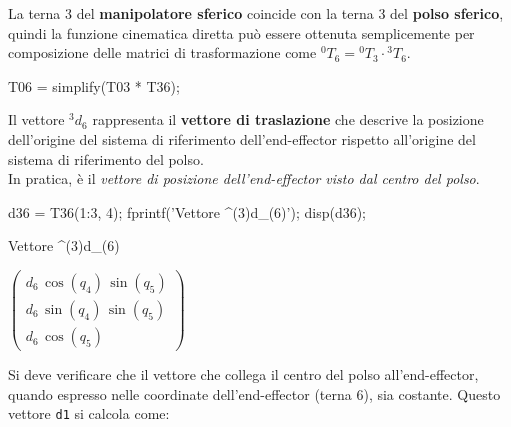 \documentclass[11pt, a4paper]{article}
\begin{document}
\begin{par}
\begin{flushleft}
La terna 3 del \textbf{manipolatore sferico} coincide con la terna 3 del \textbf{polso sferico}, quindi la funzione cinematica diretta può essere ottenuta semplicemente per composizione delle matrici di trasformazione come ${}^0 T_6 = {}^0 T_3 \cdot {}^3 T_6$.
\end{flushleft}
\end{par}

\begin{matlabcode}
T06 = simplify(T03 * T36);
\end{matlabcode}
\begin{par}
\begin{flushleft}
Il vettore $^3 d_6$ rappresenta il \textbf{vettore di traslazione} che descrive la posizione dell'origine del sistema di riferimento dell'end-effector rispetto all'origine del sistema di riferimento del polso.\\
In pratica, è il \textit{vettore di posizione dell'end-effector visto dal centro del polso}.
\end{flushleft}
\end{par}

\begin{matlabcode}
d36 = T36(1:3, 4);
fprintf('Vettore ^(3)d_(6)');
disp(d36);
\end{matlabcode}
\begin{matlaboutput}
Vettore ^(3)d_(6)
\end{matlaboutput}
\begin{matlabsymbolicoutput}
$\displaystyle \left(\begin{array}{c}
d_6 \,\cos \left(q_4 \right)\,\sin \left(q_5 \right)\\
d_6 \,\sin \left(q_4 \right)\,\sin \left(q_5 \right)\\
d_6 \,\cos \left(q_5 \right)
\end{array}\right)$
\end{matlabsymbolicoutput}


\vspace{1em}


\begin{par}
\begin{flushleft}
Si deve verificare che il vettore che collega il centro del polso all'end-effector, quando espresso nelle coordinate dell'end-effector (terna 6), sia costante. Questo vettore \texttt{d1} si calcola come:
\end{flushleft}
\end{par}
\end{document}
